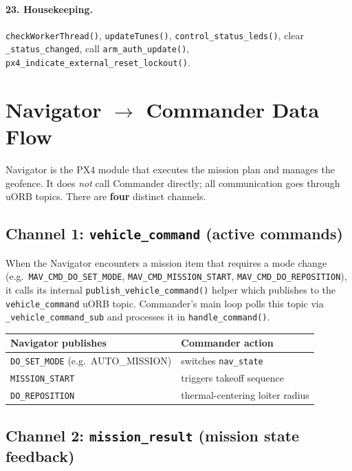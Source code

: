 \documentclass[12pt,a4paper]{article}
\begin{document}
\paragraph{23. Housekeeping.}
\texttt{checkWorkerThread()}, \texttt{updateTunes()},
\texttt{control\_status\_leds()}, clear \texttt{\_status\_changed},
call \texttt{arm\_auth\_update()}, \texttt{px4\_indicate\_external\_reset\_lockout()}.

\section{Navigator $\to$ Commander Data Flow}
\label{sec:nav2cmd}

Navigator is the PX4 module that executes the mission plan and manages the
geofence.  It does \emph{not} call Commander directly; all communication goes
through uORB topics.  There are \textbf{four} distinct channels.

\subsection{Channel 1: \texttt{vehicle\_command} (active commands)}

When the Navigator encounters a mission item that requires a mode change
(e.g.\ \texttt{MAV\_CMD\_DO\_SET\_MODE}, \texttt{MAV\_CMD\_MISSION\_START},
\texttt{MAV\_CMD\_DO\_REPOSITION}), it calls its internal
\texttt{publish\_vehicle\_command()} helper which publishes to the
\texttt{vehicle\_command} uORB topic.
Commander's main loop polls this topic via
\texttt{\_vehicle\_command\_sub} and processes it in \texttt{handle\_command()}.

\begin{center}\begin{tabular}{ll}\toprule
Navigator publishes & Commander action \\\midrule
\texttt{DO\_SET\_MODE} (e.g.\ AUTO\_MISSION) & switches \texttt{nav\_state} \\
\texttt{MISSION\_START} & triggers takeoff sequence \\
\texttt{DO\_REPOSITION} & thermal-centering loiter radius \\
\bottomrule\end{tabular}\end{center}

\subsection{Channel 2: \texttt{mission\_result} (mission state feedback)}
\end{document}
